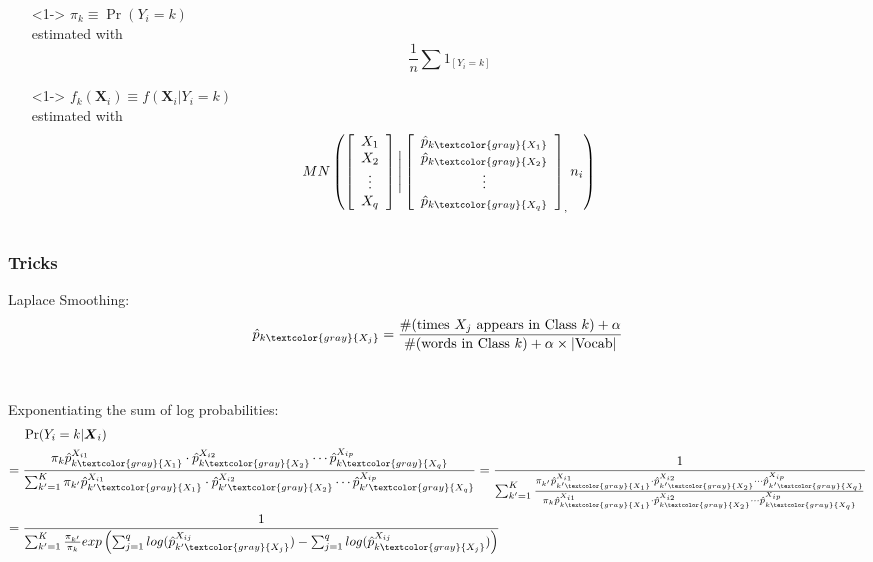 \documentclass[xcolor={dvipsnames}]{beamer}
\begin{document}
{\begin{columns}
\begin{column}{.45\textwidth}
\begin{itemize}
\item[]<1-> $\pi_k \equiv \Pr(Y_i=k)$\\ estimated with 
$$\frac{1}{n}\sum 1_{[Y_i=k]}$$
\item[]
\item[]<1-> $f_k({\boldsymbol X}_i) \equiv f({\boldsymbol X}_i|Y_i=k)$\\ estimated with
$$ MN\left(\left[\begin{array}{c} X_1 \\ X_2 \\ \vdots\\ X_q \end{array} \right] \Bigg|
 \left[\begin{array}{c} \hat p_{k\textcolor{gray}{X_1}} \\ \hat p_{k\textcolor{gray}{X_2}} \\ \vdots\\ \hat p_{k\textcolor{gray}{X_q}} \end{array} \right]_, n_i \right) $$
\item[]
\end{itemize}

\end{column}


\end{columns}

}



\frame
{
 \frametitle{Tricks}
 
 Laplace Smoothing: 
$$\hat p_{k\textcolor{gray}{X_j}} = \frac{\# (\text{times $X_j$ appears in Class }k)+ \alpha}{\# (\text{words in Class }k) + \alpha \times |\text{Vocab}|}$$\\${}$\\


Exponentiating the sum of log probabilities: 
\begin{align*}
{} & \Pr(Y_i=k|  {\boldsymbol X}_i)\\
= {} & \frac{\pi_{k} \hat p_{k\textcolor{gray}{X_1}}^{X_{i1}} \cdot \hat p_{k\textcolor{gray}{X_2}}^{X_{i2}}  \cdots \hat p_{k\textcolor{gray}{X_q}}^{X_{ip}}}{\sum_{k'=1}^K\pi_{k'} \hat p_{k'\textcolor{gray}{X_1}}^{X_{i1}} \cdot \hat p_{k'\textcolor{gray}{X_2}}^{X_{i2}}  \cdots \hat p_{k'\textcolor{gray}{X_q}}^{X_{ip}}}
= 
\frac{1}{\sum_{k'=1}^K
\frac{
\pi_{k'} \hat p_{k'\textcolor{gray}{X_1}}^{X_{i1}} \cdot \hat p_{k'\textcolor{gray}{X_2}}^{X_{i2}}  \cdots \hat p_{k'\textcolor{gray}{X_q}}^{X_{ip}}}{\pi_{k} \hat p_{k\textcolor{gray}{X_1}}^{X_{i1}} \cdot \hat p_{k\textcolor{gray}{X_2}}^{X_{i2}}  \cdots \hat p_{k\textcolor{gray}{X_q}}^{X_{ip}}
}}\\
= {} &
\frac{1}{\sum_{k'=1}^K \frac{\pi_{k'}}{\pi_{k}}
exp\left( \sum_{j=1}^q log( \hat p_{k'\textcolor{gray}{X_j}}^{X_{ij}})
-
\sum_{j=1}^q log( \hat p_{k\textcolor{gray}{X_j}}^{X_{ij}})
 \right) }\\
\end{align*}

}
\end{document}
